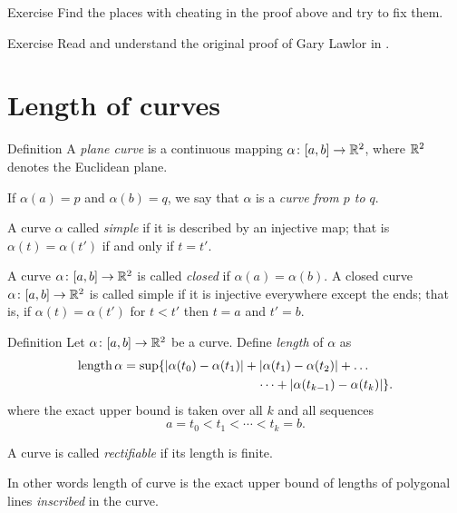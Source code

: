 \begin{thm}{Exercise}
Find the places with cheating in the proof above and try to fix them.
\end{thm}

\begin{thm}{Exercise} Read and understand the original proof of Gary Lawlor in \cite{lawlor}.
\end{thm}



\section{Length of curves}

\begin{thm}{Definition}\label{def:curve}
A \emph{plane curve} is a continuous mapping $\alpha\:[a,b]\z\to \RR^2$,
where $\mathbb{R}^2$ denotes the Euclidean plane. 

If $\alpha(a)=p$ and $\alpha(b)=q$,
we say that $\alpha$ is a \emph{curve from $p$ to $q$}.

A curve $\alpha$ called \emph{simple} if it is described by an injective map;
that is $\alpha(t)=\alpha(t')$ if and only if $t=t'$.

A curve $\alpha\colon[a,b]\to \mathbb{R}^2$ is called \emph{closed} if $\alpha(a)=\alpha(b)$.
A closed curve $\alpha\colon[a,b]\to \mathbb{R}^2$ is called simple if it is injective 
everywhere except the ends; that is, if
$\alpha(t)=\alpha(t')$ for $t<t'$ then $t=a$ and $t'=b$.
\end{thm}
 


\begin{thm}{Definition}\label{def:length}
Let $\alpha\colon[a,b]\to \mathbb{R}^2$ be a curve. Define \emph{length} of $\alpha$ as
\begin{align*}
\length \alpha
&= 
\sup \{|\alpha(t_0)-\alpha(t_1)|+|\alpha(t_1)-\alpha(t_2)|+\dots
\\
&\ \ \ \ \ \ \ \ \ \ \ \ \ \ \ \ \ \ \ \ \ \ \ \ \ \ \ \ \ \ \ \ \dots+|\alpha(t_{k-1})-\alpha(t_k)|\}. 
\end{align*}
where the exact upper bound is taken over all $k$ and all sequences 
\[a=t_0 < t_1 < \cdots < t_k=b.\]

A curve is called \emph{rectifiable} if its length is finite.
\end{thm}

In other words length of curve is the exact upper bound of lengths of polygonal lines \emph{inscribed} in the curve.


